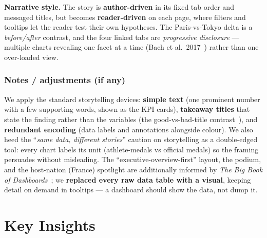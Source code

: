 \documentclass[11pt]{article}
\newcommand{\notesadj}{\subsubsection*{\color{coral}Notes / adjustments (if any)}}
\begin{document}
\textbf{Narrative style.} The story is \textbf{author-driven} in its fixed tab
order and messaged titles, but becomes \textbf{reader-driven} on each page, where
filters and tooltips let the reader test their own hypotheses. The Paris-vs-Tokyo
delta is a \emph{before/after} contrast, and the four linked tabs are
\emph{progressive disclosure} --- multiple charts revealing one facet at a time
(Bach et al.\ 2017~\cite{bach2017}) rather than one over-loaded view.
\notesadj
We apply the standard storytelling devices: \textbf{simple text} (one prominent
number with a few supporting words, shown as the KPI cards), \textbf{takeaway
titles} that state the finding rather than the variables (the good-vs-bad-title
contrast~\cite{knaflic2015}), and \textbf{redundant encoding} (data labels and
annotations alongside colour). We also heed the ``\emph{same data, different
stories}'' caution on storytelling as a double-edged tool: every chart labels its
unit (athlete-medals vs official medals) so the framing persuades without
misleading. The ``executive-overview-first'' layout, the podium, and the
host-nation (France) spotlight are additionally informed by \emph{The Big Book of
Dashboards}~\cite{bigbook2017}; we \textbf{replaced every raw data table with a
visual}, keeping detail on demand in tooltips --- a dashboard should show the
data, not dump it.

\section{Key Insights}
\label{sec:insights}
\end{document}
